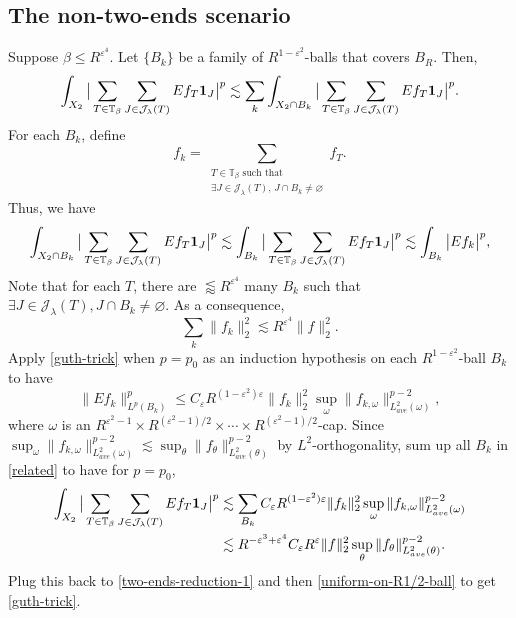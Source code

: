 \documentclass{amsart}
\numberwithin{equation}{section}
\newcommand{\be}{\beta}
\newcommand{\e}{\varepsilon}
\newcommand{\la}{\lambda}
\newcommand{\om}{\omega}
\newcommand{\cj}{\mathcal J}
\newcommand{\ZT}{\mathbb{T}}
\newcommand{\Id}{{\bf 1}}
\begin{document}
\subsection{The non-two-ends scenario} Suppose $\be\leq R^{\e^{4}}$. 
Let $\{B_k\}$ be a family of $R^{1-\e^2}$-balls that covers $B_R$. 
Then,
\begin{equation}
\label{related}
    \int_{X_2}\big|\sum_{T\in\ZT_\be}\sum_{J\in\cj_\la(T)}Ef_{T}\Id_J\big|^p\lesssim \sum_{k}\int_{X_2\cap B_k}\big|\sum_{T\in\ZT_\be}\sum_{J\in\cj_\la(T)}Ef_{T}\Id_J\big|^p.
\end{equation}
For each $B_k$, define
\begin{equation}
    f_{k}=\sum_{\substack{T\in\ZT_\be \text{ such that}\\ \exists J\in\cj_\la(T),\, J\cap B_k\not=\varnothing}} f_{T}. 
\end{equation}
Thus, we have
\begin{align}
    \int_{X_2\cap B_k}\big|\sum_{T\in\ZT_\be}\sum_{J\in\cj_\la(T)}Ef_{T}\Id_J\big|^p\lesssim\int_{B_k}\big|\sum_{T\in\ZT_\be}\sum_{J\in\cj_\la(T)}Ef_{T}\Id_J\big|^p\lesssim\int_{B_k}\big|Ef_{k}\big|^p,
\end{align}
Note that for each $T$, there are $\lessapprox R^{\e^{4}}$ many $B_k$ such that $\exists J\in\cj_\la(T), J\cap B_k\not=\varnothing$.
As a consequence, 
\begin{equation}
    \sum_{k}\|f_{k}\|_2^2\lesssim R^{\e^{4}}\|f\|_2^2. 
\end{equation}
Apply \eqref{guth-trick} when $p=p_0$ as an induction hypothesis on each $R^{1-\e^2}$-ball $B_k$ to have
\begin{equation}
    \|Ef_k\|_{L^p(B_k)}^p\leq C_\e R^{(1-\e^2)\e}\|f_k\|_2^2\sup_{\om}\|f_{k,\om}\|_{L_{ave}^2(\om)}^{p-2},
\end{equation}
where $\om$ is an $R^{\e^2-1}\times R^{(\e^2-1)/2}\times\cdots\times R^{(\e^2-1)/2}$-cap.
Since $\sup_{\om}\|f_{k,\om}\|_{L^2_{ave}(\om)}^{p-2}\lesssim\sup_{\theta}\|f_{\theta}\|_{L^2_{ave}(\theta)}^{p-2}$ by $L^2$-orthogonality, sum up all $B_k$ in \eqref{related} to have for $p=p_0$,
\begin{align}
    \int_{X_2}\big|\sum_{T\in\ZT_\be}\sum_{J\in\cj_\la(T)}Ef_{T}\Id_J\big|^p&\lesssim\sum_{B_k}C_\e R^{(1-\e^2)\e} \|f_k\|_2^2\sup_{\om}\|f_{k,\om}\|_{L^2_{ave}(\om)}^{p-2}\\
    &\lesssim R^{-\e^3+\e^4}C_\e R^\e\|f\|_2^2\sup_{\theta}\|f_{\theta}\|_{L^2_{ave}(\theta)}^{p-2}.
\end{align}
Plug this back to \eqref{two-ends-reduction-1} and then \eqref{uniform-on-R1/2-ball} to get \eqref{guth-trick}.
\end{document}
